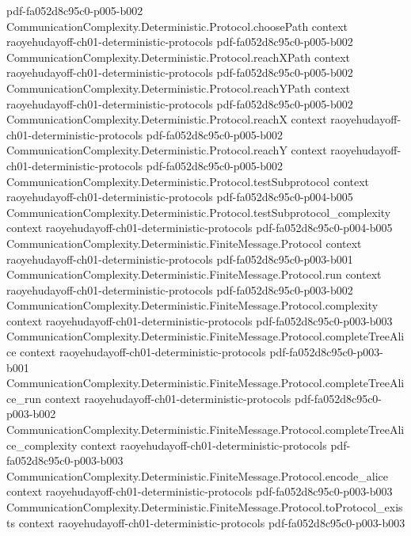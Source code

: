\begin{lemma}
  {pdf-fa052d8c95c0-p005-b002}
\proofstep
  {CommunicationComplexity.Deterministic.Protocol.choosePath}
  {context}
  {raoyehudayoff-ch01-deterministic-protocols}
  {pdf-fa052d8c95c0-p005-b002}
\proofstep
  {CommunicationComplexity.Deterministic.Protocol.reachXPath}
  {context}
  {raoyehudayoff-ch01-deterministic-protocols}
  {pdf-fa052d8c95c0-p005-b002}
\proofstep
  {CommunicationComplexity.Deterministic.Protocol.reachYPath}
  {context}
  {raoyehudayoff-ch01-deterministic-protocols}
  {pdf-fa052d8c95c0-p005-b002}
\proofstep
  {CommunicationComplexity.Deterministic.Protocol.reachX}
  {context}
  {raoyehudayoff-ch01-deterministic-protocols}
  {pdf-fa052d8c95c0-p005-b002}
\proofstep
  {CommunicationComplexity.Deterministic.Protocol.reachY}
  {context}
  {raoyehudayoff-ch01-deterministic-protocols}
  {pdf-fa052d8c95c0-p005-b002}
\proofstep
  {CommunicationComplexity.Deterministic.Protocol.testSubprotocol}
  {context}
  {raoyehudayoff-ch01-deterministic-protocols}
  {pdf-fa052d8c95c0-p004-b005}
\proofstep
  {CommunicationComplexity.Deterministic.Protocol.testSubprotocol_complexity}
  {context}
  {raoyehudayoff-ch01-deterministic-protocols}
  {pdf-fa052d8c95c0-p004-b005}
\proofstep
  {CommunicationComplexity.Deterministic.FiniteMessage.Protocol}
  {context}
  {raoyehudayoff-ch01-deterministic-protocols}
  {pdf-fa052d8c95c0-p003-b001}
\proofstep
  {CommunicationComplexity.Deterministic.FiniteMessage.Protocol.run}
  {context}
  {raoyehudayoff-ch01-deterministic-protocols}
  {pdf-fa052d8c95c0-p003-b002}
\proofstep
  {CommunicationComplexity.Deterministic.FiniteMessage.Protocol.complexity}
  {context}
  {raoyehudayoff-ch01-deterministic-protocols}
  {pdf-fa052d8c95c0-p003-b003}
\proofstep
  {CommunicationComplexity.Deterministic.FiniteMessage.Protocol.completeTreeAlice}
  {context}
  {raoyehudayoff-ch01-deterministic-protocols}
  {pdf-fa052d8c95c0-p003-b001}
\proofstep
  {CommunicationComplexity.Deterministic.FiniteMessage.Protocol.completeTreeAlice_run}
  {context}
  {raoyehudayoff-ch01-deterministic-protocols}
  {pdf-fa052d8c95c0-p003-b002}
\proofstep
  {CommunicationComplexity.Deterministic.FiniteMessage.Protocol.completeTreeAlice_complexity}
  {context}
  {raoyehudayoff-ch01-deterministic-protocols}
  {pdf-fa052d8c95c0-p003-b003}
\proofstep
  {CommunicationComplexity.Deterministic.FiniteMessage.Protocol.encode_alice}
  {context}
  {raoyehudayoff-ch01-deterministic-protocols}
  {pdf-fa052d8c95c0-p003-b003}
\proofstep
  {CommunicationComplexity.Deterministic.FiniteMessage.Protocol.toProtocol_exists}
  {context}
  {raoyehudayoff-ch01-deterministic-protocols}
  {pdf-fa052d8c95c0-p003-b003}

\end{lemma}
